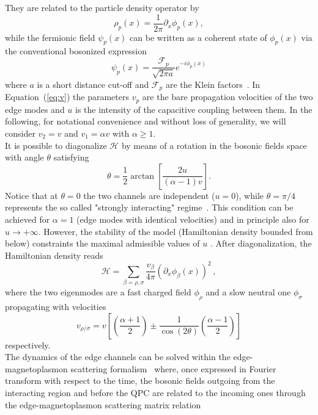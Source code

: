 \documentclass[12pt]{iopart}
\begin{document}
They are related to the particle density operator by~\cite{Miranda03, Ziani12, Ziani15}
\begin{equation}
\rho_{p}(x)=\frac{1}{2\pi}\partial_x \phi_{p}(x),
\end{equation} 
while the fermionic field $\psi_{p}(x)$ can be written as a coherent state of $\phi_{p}(x)$ via the conventional bosonized expression
\begin{equation}
    \psi_{p}(x) = \frac{\mathcal{F}_{p}}{\sqrt{2\pi a}}e^{-i\phi_{p}(x)}
\end{equation}
where $a$ is a short distance cut-off and $\mathcal{F}_{p}$ are the Klein factors~\cite{Wen95, Miranda03}. In Equation~(\ref{eq:v}) the parameters $v_{p}$ are the bare propagation velocities of the two edge modes and $u$ is the intensity of the capacitive coupling between them. In the following, for notational convenience and without loss of generality, we will consider $v_{2}=v$ and $v_{1}=\alpha v$ with $\alpha\geq 1$.\\
It is possible to diagonalize $\mathcal{H}$ by means of a rotation in the bosonic fields space with angle $\theta$ satisfying
\begin{equation}
\theta=\frac{1}{2}\arctan\left[\frac{2u}{(\alpha-1)v}\right]. 
\end{equation} 
Notice that at $\theta=0$ the two channels are independent ($u=0$), while $\theta=\pi/4$ represents the so called "strongly interacting" regime~\cite{ Wahl14, Ferraro14, Levkivskyi08, Degiovanni10, Ferraro17, Acciai18, Kovrizhin12, Slobodeniuk16}. This condition can be achieved for $\alpha=1$ (edge modes with identical velocities) and in principle also for $u\rightarrow +\infty$. However, the stability of the model (Hamiltonian density bounded from below) constraints the maximal admissible values of $u$ \cite{Ferraro17}. After diagonalization, the Hamiltonian density reads
\begin{equation}
    \mathcal{H}=\sum_{\beta=\rho,\sigma}\frac{v_\beta}{4\pi}(\partial_x\phi_\beta(x))^2\,,
\end{equation}
where the two eigenmodes are a fast charged field $\phi_\rho$ and a slow neutral one $ \phi_\sigma$ propagating with velocities 
\begin{equation}
    v_{\rho/\sigma}=v \left[\left(\frac{\alpha+1}{2}\right)\pm\frac{1}{\cos(2\theta)}\left(\frac{\alpha-1}{2}\right)\right]
\end{equation}
respectively.\\
The dynamics of the edge channels can be solved within the edge-magnetoplasmon scattering formalism~\cite{Ferraro14, Rebora21, Degiovanni10, Ferraro17, Sukhorukov15} where, once expressed in Fourier transform with respect to the time, the bosonic fields outgoing from the interacting region and before the QPC are related to the incoming ones through the edge-magnetoplasmon scattering matrix relation
\end{document}
